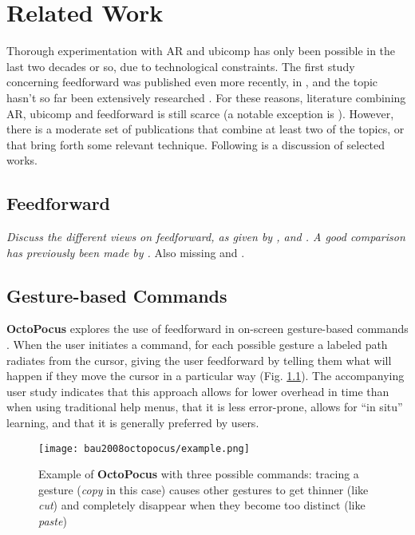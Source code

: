 \chapter{Related Work} \label{chap:relat}

Thorough experimentation with AR and ubicomp has only been possible in the last two decades or so, due to technological constraints. The first study concerning feedforward was published even more recently, in \citeyear{djajadiningrat2002but} \cite{djajadiningrat2002but}, and the topic hasn't so far been extensively researched \cite{vermeulen2013crossing}. For these reasons, literature combining AR, ubicomp and feedforward is still scarce (a notable exception is \cite{vermeulen2009bet}). However, there is a moderate set of publications that combine at least two of the topics, or that bring forth some relevant technique. Following is a discussion of selected works.

\section{Feedforward} \label{sec:related_work:feedforward}
\textit{Discuss the different views on feedforward, as given by \citeauthor{djajadiningrat2002but} \cite{djajadiningrat2002but}, \citeauthor{wensveen2004interaction} \cite{wensveen2004interaction} and \citeauthor{vermeulen2013crossing} \cite{vermeulen2013crossing}. A good comparison has previously been made by \citeauthor{chueke2016perceptible} \cite{chueke2016perceptible}.} Also missing \cite{djajadiningrat2004tangible} and \cite{norman2013design}.

\section{Gesture-based Commands} \label{sec:related_work:gesture-based_commands}
\textbf{OctoPocus} explores the use of feedforward in on-screen gesture-based commands \cite{bau2008octopocus}. When the user initiates a command, for each possible gesture a labeled path radiates from the cursor, giving the user feedforward by telling them what will happen if they move the cursor in a particular way (Fig. \ref{fig:bau2008octopocus_demo}). The accompanying user study indicates that this approach allows for lower overhead in time than when using traditional help menus, that it is less error-prone, allows for ``in situ'' learning, and that it is generally preferred by users.

\begin{figure}
    \centering
    \texttt{[image: bau2008octopocus/example.png]}
    \caption{Example of \textbf{OctoPocus} with three possible commands: tracing a gesture (\textit{copy} in this case) causes other gestures to get thinner (like \textit{cut}) and completely disappear when they become too distinct (like \textit{paste}) \cite{bau2008octopocus}}
    \label{fig:bau2008octopocus_demo}
\end{figure}

